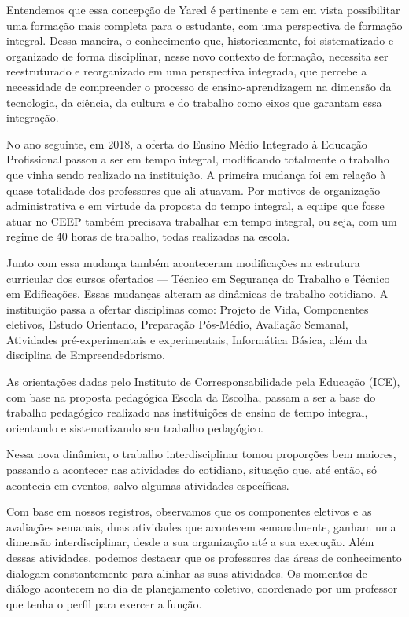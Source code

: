 \begin{refsection}
    Entendemos que essa concepção de Yared é pertinente e tem em vista possibilitar uma formação mais completa para o estudante, com uma perspectiva de formação integral. Dessa maneira, o conhecimento que, historicamente, foi sistematizado e organizado de forma disciplinar, nesse novo contexto de formação, necessita ser reestruturado e reorganizado em uma perspectiva integrada, que percebe a necessidade de compreender o processo de ensino-aprendizagem na dimensão da tecnologia, da ciência, da cultura e do trabalho como eixos que garantam essa integração.  

    No ano seguinte, em 2018, a oferta do Ensino Médio Integrado à Educação Profissional passou a ser em tempo integral, modificando totalmente o trabalho que vinha sendo realizado na instituição. A primeira mudança foi em relação à quase totalidade dos professores que ali atuavam. Por motivos de organização administrativa e em virtude da proposta do tempo integral, a equipe que fosse atuar no CEEP também precisava trabalhar em tempo integral, ou seja, com um regime de 40 horas de trabalho, todas realizadas na escola.  

    Junto com essa mudança também aconteceram modificações na estrutura curricular dos cursos ofertados --- Técnico em Segurança do Trabalho e Técnico em Edificações. Essas mudanças alteram as dinâmicas de trabalho cotidiano. A instituição passa a ofertar disciplinas como: Projeto de Vida, Componentes eletivos, Estudo Orientado, Preparação Pós-Médio, Avaliação Semanal, Atividades pré-experimentais e experimentais, Informática Básica, além da disciplina de Empreendedorismo. 

    As orientações dadas pelo Instituto de Corresponsabilidade pela Educação (ICE), com base na proposta pedagógica Escola da Escolha, passam a ser a base do trabalho pedagógico realizado nas instituições de ensino de tempo integral, orientando e sistematizando seu trabalho pedagógico.  

    Nessa nova dinâmica, o trabalho interdisciplinar tomou proporções bem maiores, passando a acontecer nas atividades do cotidiano, situação que, até então, só acontecia em eventos, salvo algumas atividades específicas.  

    Com base em nossos registros, observamos que os componentes eletivos e as avaliações semanais, duas atividades que acontecem semanalmente, ganham uma dimensão interdisciplinar, desde a sua organização até a sua execução. Além dessas atividades, podemos destacar que os professores das áreas de conhecimento dialogam constantemente para alinhar as suas atividades. Os momentos de diálogo acontecem no dia de planejamento coletivo, coordenado por um professor que tenha o perfil para exercer a função.  


\end{refsection}
